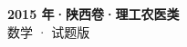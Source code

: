 \documentclass[zihao=-4, a4paper]{ctexart}
\begin{document}
\begin{center}
  {\Large\bfseries 2015 年·陕西卷·理工农医类}\\[4pt]
  {\large 数学 · 试题版}
\end{center}
\medskip
{}

\end{document}
